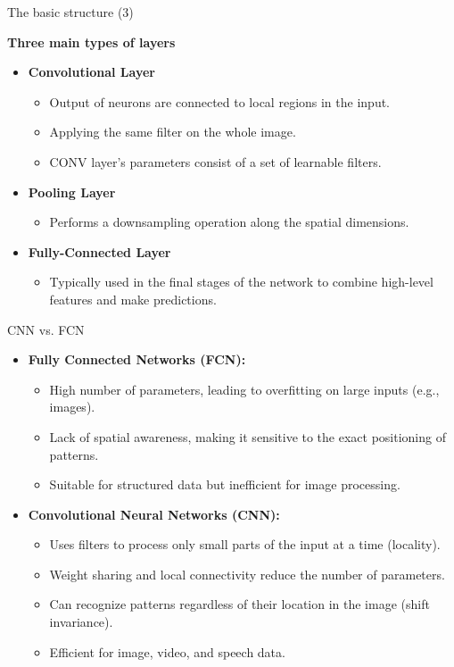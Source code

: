 \documentclass[serif, aspectratio=169]{beamer}
\begin{document}
	\begin{frame}{The basic structure (3)}
		\item \textbf{Three main types of layers}
		\begin{itemize}
			\item \textbf{Convolutional Layer}
			\begin{itemize}
				\item Output of neurons are connected to local regions in the input.
				\item Applying the same filter on the whole image.
				\item CONV layer’s parameters consist of a set of learnable filters.
			\end{itemize}
			\item \textbf{Pooling Layer}
			\begin{itemize}
				\item Performs a downsampling operation along the spatial dimensions.
			\end{itemize}
			\item \textbf{Fully-Connected Layer}
			\begin{itemize}
				\item Typically used in the final stages of the network to combine high-level features and make predictions.
			\end{itemize}
		\end{itemize}
	\end{frame}
	\begin{frame}{CNN vs. FCN}
		\begin{itemize}
			\item \textbf{Fully Connected Networks (FCN):}
			\begin{itemize}
				\item High number of parameters, leading to overfitting on large inputs (e.g., images).
				\item Lack of spatial awareness, making it sensitive to the exact positioning of patterns.
				\item Suitable for structured data but inefficient for image processing.
				
			\end{itemize}
			
			\item \textbf{Convolutional Neural Networks (CNN):}
			\begin{itemize}
				\item Uses filters to process only small parts of the input at a time (locality).
				\item Weight sharing and local connectivity reduce the number of parameters.
				\item Can recognize patterns regardless of their location in the image (shift invariance).
				\item Efficient for image, video, and speech data.				
			\end{itemize}
			
		\end{itemize}
	\end{frame}
	
\end{document}
